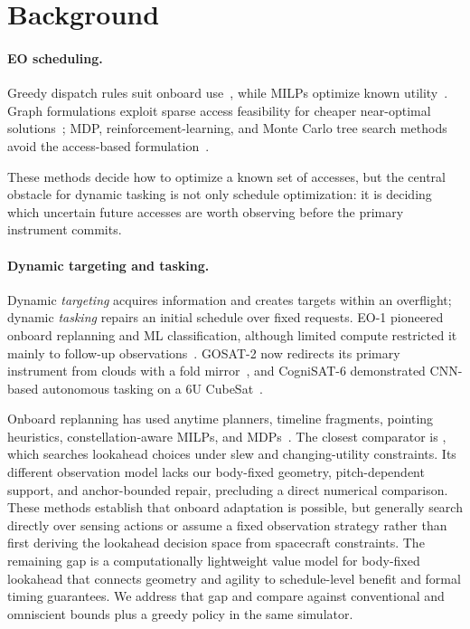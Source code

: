 \section{Background}
\label{sec:background}

\paragraph{EO scheduling.}
Greedy dispatch rules suit onboard use~\citep{bianchessi_heuristic_2007, bianchessi_planning_2008, wolfe_three_2000}, while MILPs optimize known utility~\citep{bensana_earth_1999, augenstein_optimal_2016, nag_autonomous_2019}.
Graph formulations exploit sparse access feasibility for cheaper near-optimal solutions~\citep{augenstein_optimal_2014, eddy_maximum_2021, eddy_task_2021}; MDP, reinforcement-learning, and Monte Carlo tree search methods avoid the access-based formulation~\citep{eddy_markov_2020, herrmann_reinforcement_2023, wang_deep_2023, hadj-salah_schedule_2019, herrmann_monte_2022}.

These methods decide how to optimize a known set of accesses, but the central obstacle for dynamic tasking is not only schedule optimization: it is deciding which uncertain future accesses are worth observing before the primary instrument commits.

\paragraph{Dynamic targeting and tasking.}
Dynamic \emph{targeting} acquires information and creates targets within an overflight; dynamic \emph{tasking} repairs an initial schedule over fixed requests. EO-1 pioneered onboard replanning and ML classification, although limited compute restricted it mainly to follow-up observations~\citep{chien_using_2005, chien_lessons_2005, wagstaff_cloud_2017}. GOSAT-2 now redirects its primary instrument from clouds with a fold mirror~\citep{imasu_greenhouse_2023}, and CogniSAT-6 demonstrated CNN-based autonomous tasking on a 6U CubeSat~\citep{rijlaarsdam_autonomous_2024}.

Onboard replanning has used anytime planners, timeline fragments, pointing heuristics, constellation-aware MILPs, and MDPs~\citep{damiani_continuous_2005, lenzen_onboard_2014, chien_heuristic_nodate, chien_onboard_2015, nag_autonomous_2019, candela_dynamic_2022}.
The closest comparator is \citet{kangaslahti_dynamic_2024}, which searches lookahead choices under slew and changing-utility constraints.
Its different observation model lacks our body-fixed geometry, pitch-dependent support, and anchor-bounded repair, precluding a direct numerical comparison.
These methods establish that onboard adaptation is possible, but generally search directly over sensing actions or assume a fixed observation strategy rather than first deriving the lookahead decision space from spacecraft constraints.
The remaining gap is a computationally lightweight value model for body-fixed lookahead that connects geometry and agility to schedule-level benefit and formal timing guarantees.
We address that gap and compare against conventional and omniscient bounds plus a greedy policy in the same simulator.

